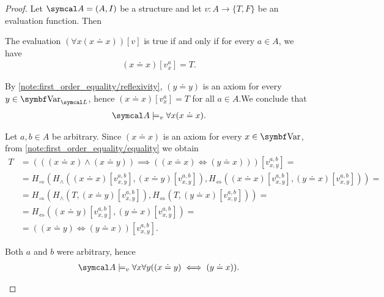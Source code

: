 \begin{proof}
  Let \( \Cal{A} = (A, I) \) be a structure and let \( v: A \to \{ T, F \} \) be an evaluation function. Then

  \begin{description}
     The evaluation \( (\forall x (x \doteq x))[v] \) is true if and only if for every \( a \in A \), we have
    \begin{align*}
      (x \doteq x)[v_x^a] = T.
    \end{align*}

    By \cref{note:first_order_equality/reflexivity}, \( (y \doteq y) \) is an axiom for every \( y \in \Bold{Var}_{\Cal{L}} \), hence \mbox{\( (x \doteq x)[v_x^a] = T \)} for all \( a \in A \).We conclude that
    \begin{align*}
      \Cal{A} \models_v \forall x (x \doteq x).
    \end{align*}

     Let \( a, b \in A \) be arbitrary. Since \( (x \doteq x) \) is an axiom for every \( x \in \Bold{Var} \), from \cref{note:first_order_equality/equality} we obtain
    \begin{align*}
      T &=
      (((x \doteq x) \land (x \doteq y)) \implies ((x \doteq x) \iff (y \doteq x)))[v_{x,y}^{a,b}]
      = \\ &=
      H_\Rightarrow(H_\land((x \doteq x)[v_{x,y}^{a,b}], (x \doteq y)[v_{x,y}^{a,b}]), H_\Leftrightarrow((x \doteq x)[v_{x,y}^{a,b}], (y \doteq x)[v_{x,y}^{a,b}]))
      = \\ &=
      H_\Rightarrow(H_\land(T, (x \doteq y)[v_{x,y}^{a,b}]), H_\Leftrightarrow(T, (y \doteq x)[v_{x,y}^{a,b}]))
      = \\ &=
      H_\Leftrightarrow((x \doteq y)[v_{x,y}^{a,b}], (y \doteq x)[v_{x,y}^{a,b}])
      = \\ &=
      ((x \doteq y) \iff (y \doteq x))[v_{x,y}^{a,b}].
    \end{align*}

    Both \( a \) and \( b \) were arbitrary, hence
    \begin{align*}
      \Cal{A} \models_v \forall x \forall y ((x \doteq y) \iff (y \doteq x)).
    \end{align*}


\end{description}
\end{proof}
